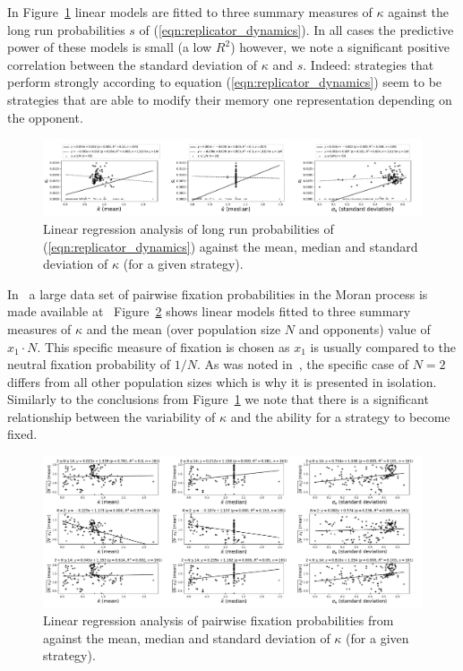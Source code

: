 \documentclass[a4paper]{article}
\begin{document}
In Figure~\ref{fig:compare-evolutionary-dynamics-to-kappa} linear models are
fitted to three summary measures of \(\kappa\) against the long run
probabilities \(s\) of (\ref{eqn:replicator_dynamics}). In all cases the
predictive power of these models is small (a low \(R^2\)) however, we note a
significant positive correlation between the standard deviation of \(\kappa\)
and \(s\). Indeed: strategies that perform strongly according to equation
(\ref{eqn:replicator_dynamics}) seem to be strategies that are able to modify
their memory one representation depending on the opponent.

\begin{figure}[!hbtp]
    \centering
    \includegraphics[width=\textwidth]{./assets/img/compare-evolutionary-dynamics-to-kappa/main.pdf}
    \caption{Linear regression analysis of long run probabilities of
    (\ref{eqn:replicator_dynamics}) against the mean, median and standard
    deviation of \(\kappa\) (for a given strategy).}
    \label{fig:compare-evolutionary-dynamics-to-kappa}
\end{figure}

In~\cite{Moran1707} a large data set of pairwise fixation probabilities in the
Moran process is made available at~\cite{vincent_knight_2017_1040129}
Figure~\ref{fig:compare-fixation-to-kappa} shows linear models fitted to three
summary measures of \(\kappa\) and the mean (over population size \(N\) and
opponents) value of \(x_1\cdot N\). This specific measure of fixation is chosen
as \(x_1\) is usually compared to the neutral fixation probability of \(1 / N\).
As was noted in~\cite{Moran1707}, the specific case of \(N=2\) differs from all
other population sizes which is why it is presented in isolation. Similarly to
the conclusions from Figure~\ref{fig:compare-evolutionary-dynamics-to-kappa}
we note that there is a significant relationship between the variability of
\(\kappa\) and the ability for a strategy to become fixed.

\begin{figure}[!hbtp]
    \centering
    \includegraphics[width=\textwidth]{./assets/img/compare-fixation-to-kappa/main.pdf}
    \caption{Linear regression analysis of pairwise fixation probabilities
    from~\cite{Moran1707} against the mean, median and standard deviation of
    \(\kappa\) (for a given strategy).}
    \label{fig:compare-fixation-to-kappa}
\end{figure}
\end{document}

